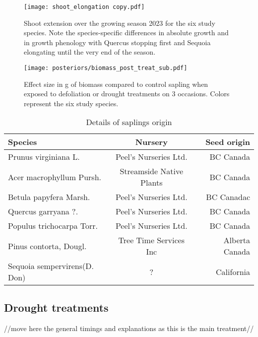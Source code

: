 \documentclass{article}
\begin{document}
	
			\begin{figure}
		\centering
		\texttt{[image: shoot\_elongation copy.pdf]} 
		\caption{Shoot extension over the growing season 2023 for the six study species. Note the species-specific differences in absolute growth and in growth phenology with Quercus stopping first and Sequoia elongating until the very end of the season.}
		\label{fig:fig_1xxx}
	\end{figure}
	
	
				\begin{figure}
		\centering
		\texttt{[image: posteriors/biomass\_post\_treat\_sub.pdf]} 
		\caption{Effect size in g of biomass compared to control sapling when exposed to defoliation or drought treatments on 3 occasions. Colors represent the six study species.}
		\label{fig:fig_1xxx}
	\end{figure}
	
	
	
	
	\begin{table}[h!]
		\begin{center}
			\caption{Details of saplings origin }
			\label{tab:table1}
			\begin{tabular}{l|c|r} %
				\textbf{Species} & \textbf{Nursery} & \textbf{Seed origin}\\
				\hline
				Prunus virginiana L. & Peel's Nurseries Ltd. & BC Canada\\
				Acer macrophyllum Pursh. & Streamside Native Plants & BC Canada\\
				Betula papyfera Marsh. & Peel's Nurseries Ltd. &BC Canadac\\
				Quercus garryana ?.& Peel's Nurseries Ltd. & BC Canada\\
				Populus trichocarpa Torr. & Peel's Nurseries Ltd.& BC Canada\\
				Pinus contorta, Dougl. & Tree Time Services Inc & Alberta Canada\\
				Sequoia sempervirens(D. Don)&? & California\\
				
			\end{tabular}
		\end{center}
	\end{table}
	
	\subsection*{Drought treatments}
	//move here the general timings and explanations as this is the main treatment//
	
\end{document}
